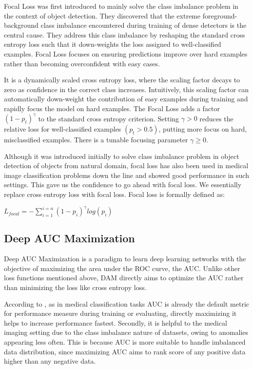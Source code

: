 Focal Loss was first introduced to mainly solve the class imbalance problem in the context of object detection. They discovered that the extreme foreground-background class imbalance encountered
during training of dense detectors is the central cause. They address this class imbalance by reshaping the
standard cross entropy loss such that it down-weights the
loss assigned to well-classified examples. Focal Loss focuses on ensuring predictions improve over hard examples rather than becoming overconfident with easy cases.

It is a dynamically scaled cross entropy loss, where the scaling factor decays to zero as confidence in the correct class increases. Intuitively, this scaling factor can automatically down-weight the contribution of easy examples during training and rapidly focus the model on hard examples. The Focal Loss adds a factor $(1-p_t)^\gamma$ to the standard cross entropy criterion. Setting $\gamma>0$
 reduces the relative loss for well-classified examples $(p_t>0.5)$, putting more focus on hard, misclassified examples. There is a tunable focusing parameter $\gamma\geq0$. 

 Although it was introduced initially to solve class imbalance problem in object detection of objects from natural domain, focal loss has also been used in medical image classification problems down the line \cite{lotfy2019investigation} \cite{tran2019improving} and showed good performance in such settings. This gave us the confidence to go ahead with focal loss. We essentially replace cross entropy loss with focal loss. Focal loss is formally defined as:

 \begin{center}
{ $L_{focal}=-\sum_{i=1}^{i=n}(1-p_i)^{\gamma}log(p_i)$}
\end{center}


\subsection{Deep AUC Maximization}
Deep AUC Maximization is a paradigm to learn deep learning networks with the objective of maximizing the area under the ROC curve, the AUC. Unlike other loss functions mentioned above, DAM directly aims to optimize the AUC rather than minimizing the loss like cross entropy loss.

According to \cite{yuan2021large}, as in medical classification tasks AUC is already the default metric for performance measure during training or evaluating, directly maximizing it helps to increase performance fastest.
Secondly, it is helpful to the medical imaging setting due to the class imbalance nature of datasets, owing to anomalies appearing less often. This is because AUC is more suitable to handle imbalanced data distribution, since maximizing AUC aims to rank score of any positive data higher than any negative data.

